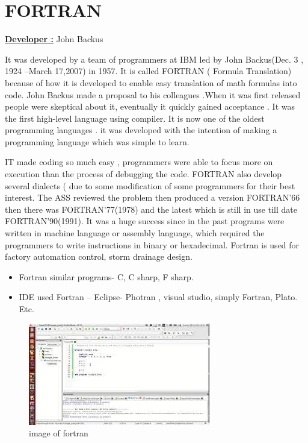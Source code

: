 \documentclass{article}
\begin{document}
	\section{FORTRAN}
\textbf{\underline{Developer :}}	  John Backus

It was developed by a team of programmers at IBM led by John Backus(Dec. 3 , 1924 –March 17,2007) in 1957. It is called FORTRAN ( Formula Translation)  because of how it is developed to enable easy translation of math formulas into code. John Backus made a proposal to his colleagues .When it was first released people were skeptical about it, eventually it quickly gained acceptance  . It was the first high-level language using compiler. It is now one of the oldest programming languages . it was developed with the intention of making a programming language which was simple to learn.

IT made coding so much easy , programmers were able to focus more on execution than the process of debugging the code. FORTRAN also develop several dialects ( due to some modification of some programmers for their best interest. The ASS reviewed the problem then produced a version FORTRAN’66 then there was FORTRAN’77(1978) and the latest which is still in use till date FORTRAN’90(1991). It was a huge success since in the past programs were written in machine language or assembly language, which required the programmers to write instructions in binary or hexadecimal. Fortran is used for factory automation control, storm drainage design.

	\begin{itemize}
		\item Fortran  similar programs- C, C sharp, F sharp.
		\item IDE used Fortran – Eclipse- Photran , visual studio, simply Fortran, Plato. Etc.
		\end{itemize}
	
		\begin{figure}
			\centering
			\includegraphics[width=0.7\linewidth]{fortan}
			\caption{image of fortran}
			\label{fig:fortan}
		\end{figure}
	
\end{document}
